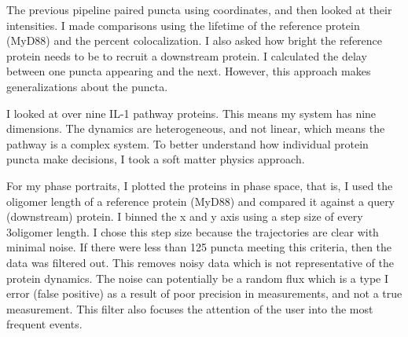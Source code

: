 The previous pipeline paired puncta using coordinates, and then looked at their intensities. I made comparisons using the lifetime of the reference protein (MyD88) and the percent colocalization. I also asked how bright the reference protein needs to be to recruit a downstream protein. I calculated the delay between one puncta appearing and the next. However, this approach makes generalizations about the puncta.

I looked at over nine IL-1 pathway proteins. This means my system has nine dimensions. The dynamics are heterogeneous, and not linear, which means the pathway is a complex system. To better understand how individual protein puncta make decisions, I took a soft matter physics approach.

For my phase portraits, I plotted the proteins in phase space, that is, I used the oligomer length of a reference protein (MyD88) and compared it against a query (downstream) protein. I binned the x and y axis using a step size of every 3\times oligomer length. I chose this step size because the trajectories are clear with minimal noise. If there were less than 125 puncta meeting this criteria, then the data was filtered out. This removes noisy data which is not representative of the protein dynamics. The noise can potentially be a random flux which is a type I error (false positive) as a result of poor precision in measurements, and not a true measurement. This filter also focuses the attention of the user into the most frequent events.

